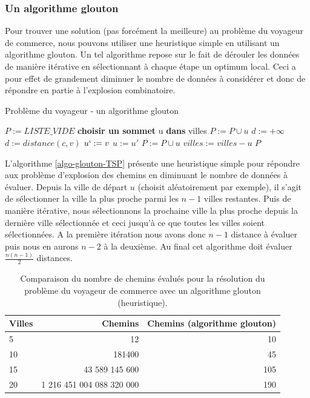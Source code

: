 \subsubsection{Un algorithme glouton}
Pour trouver une solution (pas forcément la meilleure) au problème du voyageur de commerce, nous pouvons utiliser une heuristique simple en utilisant un algorithme glouton. Un tel algorithme repose sur le fait de dérouler les données de manière itérative en sélectionnant à chaque étape un optimum local. Ceci a pour effet de grandement diminuer le nombre de données à considérer et donc de répondre en partie à l'explosion combinatoire.

\begin{algorithm}
\caption{Problème du voyageur - un algorithme glouton} 
\label{algo-glouton-TSP}
\begin{algorithmic}
    \State $P := LISTE\_VIDE$
    \State \textbf{choisir un sommet} u \textbf{dans} villes
    \State $P := P \cup u$
        \State $d := +\infty$
                \State $d := distance(c, v)$
                \State $u` := v$
            \EndIf
        \EndFor
        \State $u := u'$
        \State $P := P \cup u$
        \State $villes := villes - u$
    \EndWhile
    \State \Return $P$
\EndFunction
\end{algorithmic}
\end{algorithm}

L'algorithme \ref{algo-glouton-TSP} présente une heuristique simple pour répondre aux problème d'explosion des chemins en diminuant le nombre de données à évaluer. 
Depuis la ville de départ $u$ (choisit aléatoirement par exemple), il s'agit de sélectionner la ville la plus proche parmi les $n-1$ villes restantes. Puis de manière itérative, nous sélectionnons la prochaine ville la plus proche depuis la dernière ville sélectionnée et ceci jusqu'à ce que toutes les villes soient sélectionnées. 
A la première itération nous avons donc $n-1$ distance à évaluer puis nous en aurons $n-2$ à la deuxième. Au final cet algorithme doit évaluer $\frac{n(n-1)}{2}$ distances. 

\begin{table}[h]
\centering
\label{table-comparaison-chemins}
\begin{tabular}{ l|r|r }
  Villes & Chemins & Chemins (algorithme glouton) \\
  \hline
  5  &  12                       & 10  \\
  10 & 181400                    & 45  \\
  15 & 43 589 145 600            & 105 \\
  20 & 1 216 451 004 088 320 000 & 190 \\
\end{tabular}
  \caption{Comparaison du nombre de chemins évalués pour la résolution du problème du voyageur de commerce avec un algorithme glouton (heuristique).}
\end{table}


